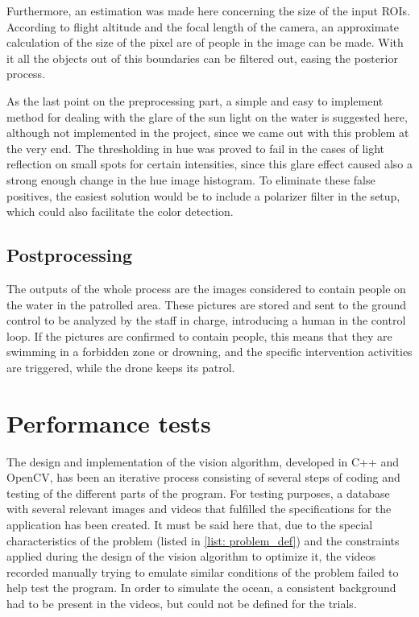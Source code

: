 Furthermore, an estimation was made here concerning the size of the input ROIs. 
According to flight altitude and the focal length of the camera, an approximate calculation
of the size of the pixel are of people in the image can be made. 
With it all the objects out of this boundaries can be filtered out, easing the posterior process.

As the last point on the preprocessing part, a simple and easy to implement method for dealing with the glare
of the sun light on the water is suggested here, although not implemented in the project, since we came out with this problem at the very end.
The thresholding in hue was proved to fail in the cases of light reflection on small spots for certain intensities,
since this glare effect caused also a strong enough change in the hue image histogram. 
To eliminate these false positives, the easiest solution would be to include a polarizer filter in the setup,
which could also facilitate the color detection. 

\subsection{Postprocessing}
The outputs of the whole process are the images considered to contain people on the water in the patrolled area. 
These pictures are stored and sent to the ground control to be analyzed by the staff in charge,
introducing a human in the control loop.
If the pictures are confirmed to contain people, this means that they are swimming in a forbidden zone or drowning,
and the specific intervention activities are triggered, while the drone keeps its patrol. 

\section{Performance tests}
The design and implementation of the vision algorithm, developed in C++ and OpenCV, has been an iterative
process consisting of several steps of coding and testing of the different parts of the program. 
For testing purposes, a database with several relevant images and videos that fulfilled the specifications for
the application has been created. 
It must be said here that, due to the special characteristics of the problem (listed in \ref{list: problem_def})
and the constraints applied during the design of the vision algorithm to optimize it,
the videos recorded manually trying to emulate similar conditions of the problem failed to help test the program. 
In order to simulate the ocean, a consistent background had to be present in the videos,
but could not be defined for the trials. 

